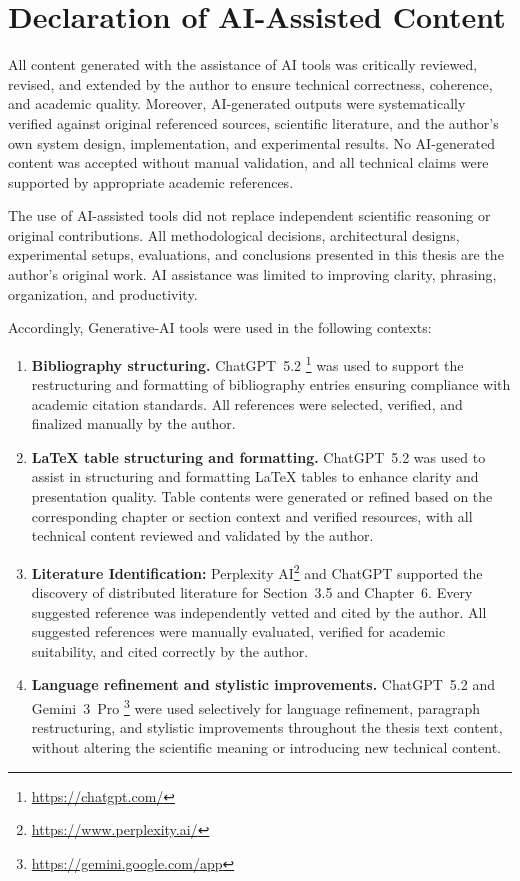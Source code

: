 \clearpage
\begingroup
\chapter*{Declaration of AI-Assisted Content}
\endgroup


All content generated with the assistance of AI tools was critically reviewed, revised, and extended by the author to ensure technical correctness, coherence, and academic quality. Moreover, AI-generated outputs were systematically verified against original referenced sources, scientific literature, and the author’s own system design, implementation, and experimental results. No AI-generated content was accepted without manual validation, and all technical claims were supported by appropriate academic references.

The use of AI-assisted tools did not replace independent scientific reasoning or original contributions. All methodological decisions, architectural designs, experimental setups, evaluations, and conclusions presented in this thesis are the author’s original work. AI assistance was limited to improving clarity, phrasing, organization, and productivity.

Accordingly, Generative-AI tools were used in the following contexts:

\begin{enumerate}
    \item \textbf{Bibliography structuring.}  
    ChatGPT~5.2 \footnote{\url{https://chatgpt.com/}} was used to support the restructuring and formatting of bibliography entries ensuring compliance with academic citation standards. All references were selected, verified, and finalized manually by the author.

    \item \textbf{LaTeX table structuring and formatting.}  
    ChatGPT~5.2 was used to assist in structuring and formatting LaTeX tables to enhance clarity and presentation quality. Table contents were generated or refined based on the corresponding chapter or section context and verified resources, with all technical content reviewed and validated by the author.

    \item \textbf{Literature Identification:} Perplexity AI\footnote{\url{https://www.perplexity.ai/}} and ChatGPT supported the discovery of distributed literature for Section~3.5 and Chapter~6. Every suggested reference was independently vetted and cited by the author. All suggested references were manually evaluated, verified for academic suitability, and cited correctly by the author.

    \item \textbf{Language refinement and stylistic improvements.}  
    ChatGPT~5.2 and Gemini~3~Pro \footnote{\url{https://gemini.google.com/app}} were used selectively for language refinement, paragraph restructuring, and stylistic improvements throughout the thesis text content, without altering the scientific meaning or introducing new technical content.
\end{enumerate}
